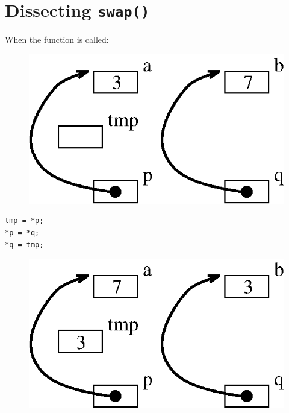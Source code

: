 \documentclass[a4,portraitt]{slides}
\begin{document}
\newpage
\section*{Dissecting {\tt swap()}}
When the function is called:
\begin{center}
\begin{figure}[h]
\centerline{
\includegraphics{../Figs/point8_7.eps}
}
\end{figure}
\end{center}
\begin{verbatim}
tmp = *p;
*p = *q;
*q = tmp;
\end{verbatim}
\begin{center}
\begin{figure}[h]
\centerline{
\includegraphics{../Figs/point8_8.eps}
}
\end{figure}
\end{center}

\newpage
\end{document}
